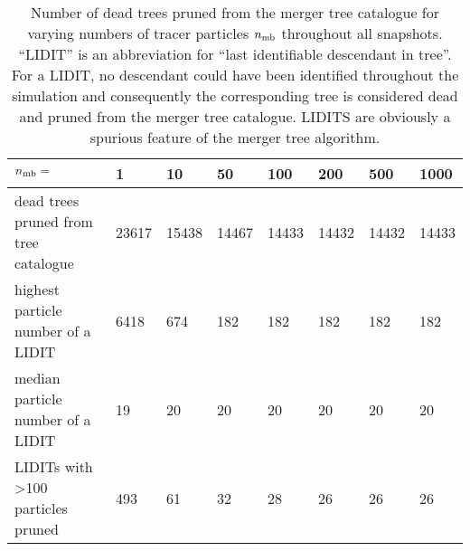 \begin{table*}
  
  \caption{Number of dead trees pruned from the merger tree catalogue
    for varying numbers of tracer particles $n_{\rm mb}$ throughout
    all snapshots.  ``LIDIT'' is an abbreviation for ``last
    identifiable descendant in tree''.  For a LIDIT, no descendant
    could have been identified throughout the simulation and
    consequently the corresponding tree is considered dead and pruned
    from the merger tree catalogue. LIDITS are obviously a spurious
    feature of the merger tree algorithm.
    \label{tab:ntracers-pruning}
  }
  
  {\small 
    \begin{tabular}[c]{l | p{1cm} | p{1cm} | p{1cm} | p{1cm} | p{1cm} | p{1cm} | p{1cm} |}
      $n_{\rm mb}=$													&	1 		& 	10 	& 	50 	& 100 	& 200 	& 500 	& 1000  
      \\
      \hline	
      dead trees pruned from tree catalogue	&	23617	&	15438	&	14467	& 14433 & 14432 & 14432 & 14433 
      \\	
      highest particle number of a LIDIT		&	6418	&	674		&	182		&	182 	& 182 	& 182 	& 182  	
      \\	
      median particle number of a LIDIT			&	19		&	20		&	20		&	20 		& 20 		& 20 		& 20  	
      \\
      LIDITs with >100 particles pruned 		&	493		&	61		&	32		&	28 		& 26 		& 26 		& 26  	
      \\
      \hline
    \end{tabular}
  }
\end{table*}
